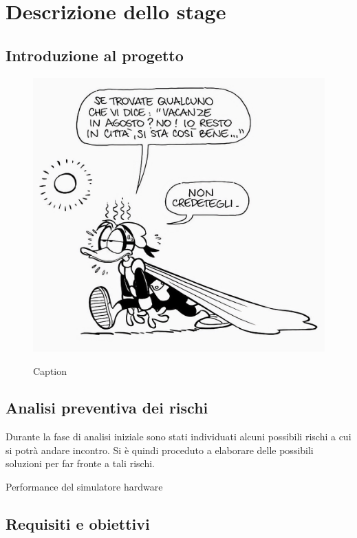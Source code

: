 \chapter{Descrizione dello stage}
\label{chap:descrizione-stage}

\section{Introduzione al progetto}
\begin{figure}[!ht] 
    \centering 
    \includegraphics[alt={Testo alternativo dell'immagine}, width=0.5\columnwidth]{img/pk_estate.jpeg}
    \caption{Caption}
    \label{fig:pk_estate}
\end{figure}
\lipsum[1]

\section{Analisi preventiva dei rischi}

Durante la fase di analisi iniziale sono stati individuati alcuni possibili rischi a cui si potrà andare incontro.
Si è quindi proceduto a elaborare delle possibili soluzioni per far fronte a tali rischi.

\begin{risk}{Performance del simulatore hardware}
    \label{risk:hardware-simulator} 
\end{risk}

\section{Requisiti e obiettivi}

